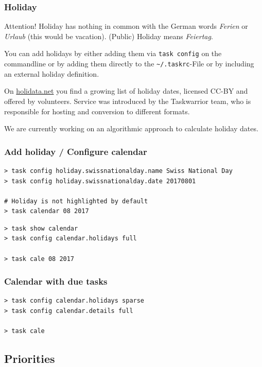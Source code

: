 \documentclass[t,handout,aspectratio=169]{beamer}
\begin{document}
\begin{frame}[fragile]\frametitle{Holiday}
    \begin{alertblock}{Attention!}
        Holiday has nothing in common with the German words \textit{Ferien} or \textit{Urlaub} (this would be vacation). (Public) Holiday means \textit{Feiertag}.
    \end{alertblock} \pause

    You can add holidays by either adding them via \verb=task config= on the commandline or by adding them directly to the \verb=~/.taskrc=-File or by including an external holiday definition. \pause

    On \href{http://holidata.net/}{holidata.net} you find a growing list of holiday dates, licensed CC-BY and offered by volunteers. Service was introduced by the Taskwarrior team, who is responsible for hosting and conversion to different formats. \pause

    We are currently working on an algorithmic approach to calculate holiday dates.
\end{frame}

\begin{frame}[fragile]\frametitle{Add holiday / Configure calendar}
    \vfill
    \begin{lstlisting}
> task config holiday.swissnationalday.name Swiss National Day
> task config holiday.swissnationalday.date 20170801

# Holiday is not highlighted by default
> task calendar 08 2017\end{lstlisting} \pause

    \vfill

    \begin{lstlisting}
> task show calendar
> task config calendar.holidays full

> task cale 08 2017\end{lstlisting}
\end{frame}

\begin{frame}[fragile]\frametitle{Calendar with due tasks}
    \vfill
    \begin{lstlisting}
> task config calendar.holidays sparse
> task config calendar.details full

> task cale\end{lstlisting}
\end{frame}

\subsection{Priorities}
\end{document}
